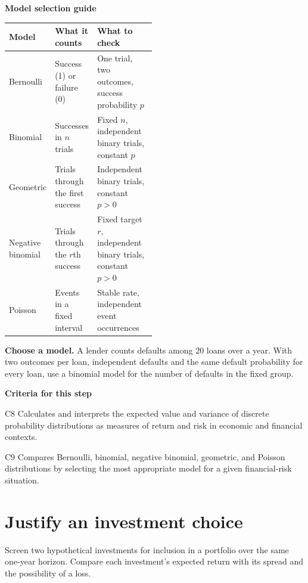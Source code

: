 \begin{center}
\textbf{Model selection guide}\par\nobreak\smallskip
\begin{tabularx}{\linewidth}{@{}R{0.20\linewidth} R{0.29\linewidth} L@{}}
\toprule
\textbf{Model} & \textbf{What it counts} & \textbf{What to check}\\
\midrule
Bernoulli & Success (1) or failure (0) & One trial, two outcomes, success probability \(p\)\\
\addlinespace
Binomial & Successes in \(n\) trials & Fixed \(n\), independent binary trials, constant \(p\)\\
\addlinespace
Geometric & Trials through the first success & Independent binary trials, constant \(p>0\)\\
\addlinespace
Negative binomial & Trials through the \(r\)th success & Fixed target \(r\), independent binary trials, constant \(p>0\)\\
\addlinespace
Poisson & Events in a fixed interval & Stable rate, independent event occurrences\\
\bottomrule
\end{tabularx}
\end{center}

\textbf{Choose a model.} A lender counts defaults among \(20\) loans over a year. With two outcomes per loan, independent defaults and the same default probability for every loan, use a binomial model for the number of defaults in the fixed group.

\textbf{Criteria for this step}
\begin{stepcriteria}
\item[C8] Calculates and interprets the expected value and variance of discrete probability distributions as measures of return and risk in economic and financial contexts.
\item[C9] Compares Bernoulli, binomial, negative binomial, geometric, and Poisson distributions by selecting the most appropriate model for a given financial-risk situation.
\end{stepcriteria}

\clearpage
\section{Justify an investment choice}

Screen two hypothetical investments for inclusion in a portfolio over the same one-year horizon. Compare each investment's expected return with its spread and the possibility of a loss.

